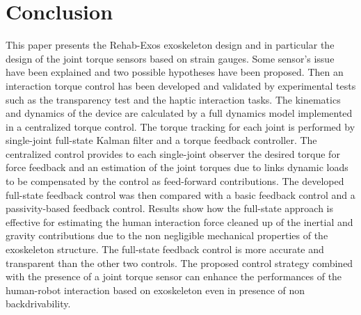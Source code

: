 \section{Conclusion} \label{sec:conclusion}
This paper presents the Rehab-Exos exoskeleton design and in particular the design of the joint torque sensors based on strain gauges. Some sensor's issue have been explained and two possible hypotheses have been proposed. Then an interaction torque control has been developed and validated by experimental tests such as the transparency test and the haptic interaction tasks. The kinematics and dynamics of the device are calculated by a full dynamics model implemented in a centralized torque control. The torque tracking for each joint is performed by single-joint full-state Kalman filter and a torque feedback controller. The centralized control provides to each single-joint observer the desired torque for force feedback and an estimation of the joint torques due to links dynamic loads to be compensated by the control as feed-forward contributions. The developed full-state feedback control was then compared with a basic feedback control and a passivity-based feedback control. Results show how the  full-state approach is effective for estimating the human interaction force cleaned up of the inertial and gravity contributions due to the non negligible mechanical properties of the exoskeleton structure. The full-state feedback control is more accurate and transparent than the other two controls. The proposed control strategy combined with the presence of a joint torque sensor can enhance the performances of the human-robot interaction based on exoskeleton even in presence of non backdrivability.
%
